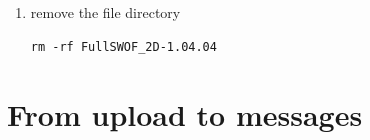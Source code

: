 \documentclass[a4paper, 11pt]{article}
\begin{document}
\begin{enumerate}
\begin{enumerate}
\item check the .jar file is running properly
\begin{verbatim}
java -jar FullSWOF_UI-2.00.00.jar
\end{verbatim}

\end{enumerate} 

\color{black}

\item remove the file directory
\begin{verbatim}
rm -rf FullSWOF_2D-1.04.04
\end{verbatim}
\end{enumerate}


\section{From upload to messages}
\end{document}
